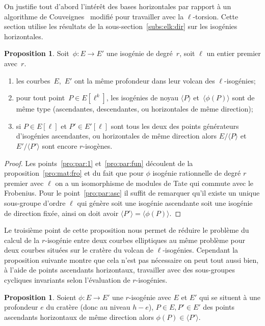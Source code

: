\documentclass[10pt,a4paper]{book}
\theoremstyle{plain}
\theoremstyle{definition}
\theoremstyle{definition}
\theoremstyle{definition}
\theoremstyle{definition}
\newtheorem{prop}[thm]{Proposition}
\theoremstyle{definition}
\theoremstyle{remark}
\theoremstyle{remark}
\theoremstyle{definition}
\begin{document}
On justifie tout d'abord l'intérêt des bases horizontales par rapport à un 
algorithme de Couveignes~\cite{Couveignes96} modifié pour travailler avec la
$\ell$-torsion. Cette section utilise les résultats de la 
sous-section~\ref{subs:elk:dir} sur les isogénies horizontales.

\begin{prop}\label{pro:par:iso}
Soit~$\phi: E \rightarrow E'$ une isogénie de degré~$r$, soit $\ell$ un entier 
premier avec~$r$.
\begin{enumerate}
\item\label{pro:par:1} les courbes~$E$,~$E'$ ont la même profondeur dans leur volcan des
 $\ell$-isogénies;
\item\label{pro:par:fun} pour tout point~$P \in E[\ell^k]$,
les isogénies de noyau $\langle P \rangle$ et~$\langle \phi(P) \rangle$ sont de même type
(ascendantes, descendantes, ou horizontales de même direction);
\item\label{pro:par:asc} si $P \in E[\ell]$ et $P' \in E'[\ell]$ sont tous les 
deux des points générateurs d'isogénies ascendantes, ou horizontales de même 
direction alors $E/\langle P \rangle$ et~$E'/\langle P' \rangle$ sont encore $r$-isogènes.
\end{enumerate}
\end{prop}

\begin{proof}
Les points~\eqref{pro:par:1} et~\eqref{pro:par:fun} découlent de la 
proposition~\ref{pro:mat:fro} et du fait que pour $\phi$ isogénie rationnelle 
de degré $r$ premier avec $\ell$ on a un isomorphisme de modules de Tate qui 
commute avec le Frobenius. Pour le point~\eqref{pro:par:asc} il suffit de 
remarquer qu'il existe un unique sous-groupe d'ordre $\ell$ qui génère soit une
isogénie ascendante soit une isogénie de direction fixée, ainsi on doit avoir 
$\langle P' \rangle=\langle \phi(P) \rangle$.

\end{proof}
Le troisième point de cette proposition nous permet de réduire le problème du 
calcul de la $r$-isogénie entre deux courbes elliptiques au même problème pour 
deux courbes situées sur le cratère du volcan de $\ell$-isogénies. Cependant la
proposition suivante montre que cela n'est pas nécessaire on peut tout aussi 
bien, à l'aide de points ascendants horizontaux, travailler avec des 
sous-groupes cycliques invariants selon l'évaluation de $r$-isogénies. 

\begin{prop}
\label{pro:par:hor:par}
Soient $\phi: E \rightarrow E'$ une $r$-isogénie avec $E$ et $E'$ qui se
situent à une profondeur $e$ du cratère (donc au niveau $h-e$), $P \in E,P' \in
E'$ des points ascendants horizontaux de même direction alors $\phi(P) \in 
\langle P' \rangle$. 
\end{prop}
\end{document}

